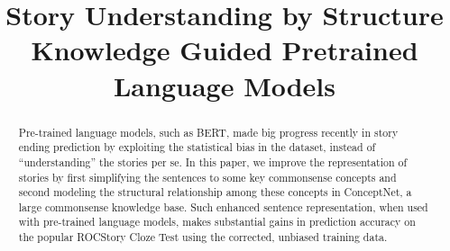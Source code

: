\documentclass{article}
\renewcommand\appendix{\setcounter{secnumdepth}{-2}}
\begin{document}
\title{Story Understanding by Structure Knowledge Guided Pretrained Language Models}

\maketitle

\begin{abstract}
Pre-trained language models, such as BERT, made big progress recently in
story ending prediction by exploiting the statistical bias in the
dataset, instead of ``understanding'' the stories per se.  
In this paper, we improve the representation
of stories by first simplifying the sentences to some key commonsense
concepts and second modeling the structural relationship among these concepts 
in ConceptNet, a large commonsense knowledge base. 
Such enhanced sentence representation, 
when used with pre-trained language models, 
makes substantial gains in prediction accuracy on the popular ROCStory
Cloze Test using the corrected, unbiased training data. 
\end{abstract}









\end{document}
